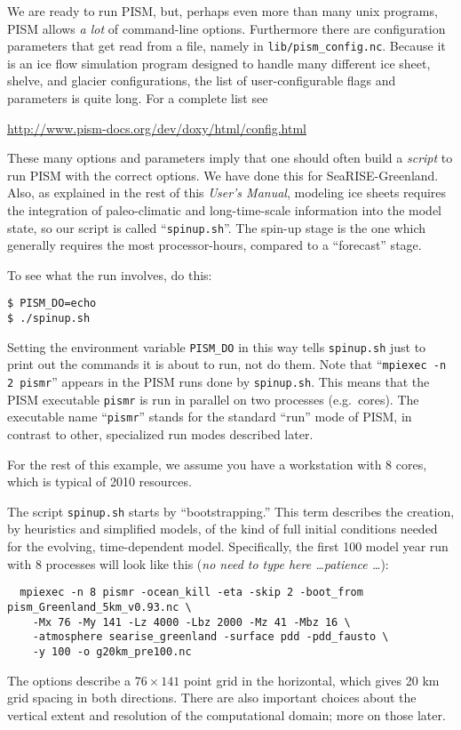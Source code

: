 We are ready to run PISM, but, perhaps even more than many unix programs, PISM allows \emph{a lot} of command-line options.  Furthermore there are configuration parameters that get read from a file, namely in \texttt{lib/pism_config.nc}.  Because it is an ice flow simulation program designed to handle many different ice sheet, shelve, and glacier configurations, the list of user-configurable flags and parameters is quite long.  For a complete list see
\begin{center}
\url{http://www.pism-docs.org/dev/doxy/html/config.html}
\end{center}

These many options and parameters imply that one should often build a \emph{script} to run PISM with the correct options.  We have done this for SeaRISE-Greenland.  Also, as explained in the rest of this \emph{User's Manual}, modeling ice sheets requires the integration of paleo-climatic and long-time-scale information into the model state, so our script is called ``\texttt{spinup.sh}''.  The spin-up stage is the one which generally requires the most processor-hours, compared to a ``forecast'' stage.

To see what the run involves, do this:
\begin{verbatim}
$ PISM_DO=echo
$ ./spinup.sh
\end{verbatim}
\noindent Setting the environment variable \texttt{PISM_DO} in this way tells \texttt{spinup.sh} just to print out the commands it is about to run, not do them.  Note that ``\texttt{mpiexec -n 2 pismr}'' appears in the PISM runs done by \texttt{spinup.sh}.  This means that the PISM executable \texttt{pismr} is run in parallel on two processes (e.g.~cores).  The executable name ``\texttt{pismr}'' stands for the standard ``run'' mode of PISM, in contrast to other, specialized run modes described later.

For the rest of this example, we assume you have a workstation with 8 cores, which is typical of 2010 resources.

The script \texttt{spinup.sh} starts by ``bootstrapping.''  This term describes the creation, by heuristics and simplified models, of the kind of full initial conditions needed for the evolving, time-dependent model.  Specifically, the first 100 model year run with 8 processes will look like this (\emph{no need to type here \dots patience \dots}):
\small
\begin{verbatim}
  mpiexec -n 8 pismr -ocean_kill -eta -skip 2 -boot_from pism_Greenland_5km_v0.93.nc \
    -Mx 76 -My 141 -Lz 4000 -Lbz 2000 -Mz 41 -Mbz 16 \
    -atmosphere searise_greenland -surface pdd -pdd_fausto \
    -y 100 -o g20km_pre100.nc
\end{verbatim}
\normalsize
The options describe a $76\times 141$ point grid in the horizontal, which gives 20 km grid spacing in both directions.  There are also important choices about the vertical extent and resolution of the computational domain; more on those later.  


